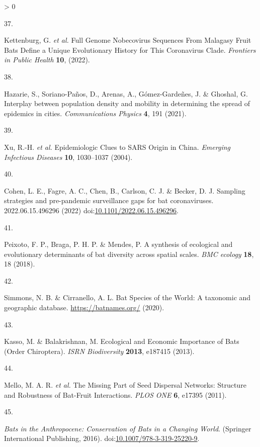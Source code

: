 \documentclass[10pt,oneside]{article}
\newlength{\cslhangindent}
\newlength{\csllabelwidth}
\newenvironment{CSLReferences}[3] %
 {%
  \setlength{\parindent}{0pt}
  \ifodd #1 \everypar{\setlength{\hangindent}{\cslhangindent}}\ignorespaces\fi
  \ifnum #2 > 0
  \setlength{\parskip}{#2\baselineskip}
  \fi
 }%
 {}
\newcommand{\CSLLeftMargin}[1]{\parbox[t]{\maxof{\widthof{#1}}{\csllabelwidth}}{#1}}
\newcommand{\CSLRightInline}[1]{\parbox[t]{\linewidth}{#1}}
\begin{document}
\begin{CSLReferences}{0}{0}
\leavevmode\hypertarget{ref-Kettenburg2022FulGen}{}%
\CSLLeftMargin{37. }
\CSLRightInline{Kettenburg, G. \emph{et al.} Full Genome Nobecovirus
Sequences From Malagasy Fruit Bats Define a Unique Evolutionary History
for This Coronavirus Clade. \emph{Frontiers in Public Health}
\textbf{10}, (2022).}

\leavevmode\hypertarget{ref-Hazarie2021IntPop}{}%
\CSLLeftMargin{38. }
\CSLRightInline{Hazarie, S., Soriano-Paños, D., Arenas, A.,
Gómez-Gardeñes, J. \& Ghoshal, G. Interplay between population density
and mobility in determining the spread of epidemics in cities.
\emph{Communications Physics} \textbf{4}, 191 (2021).}

\leavevmode\hypertarget{ref-Xu2004EpiClu}{}%
\CSLLeftMargin{39. }
\CSLRightInline{Xu, R.-H. \emph{et al.} Epidemiologic Clues to SARS
Origin in China. \emph{Emerging Infectious Diseases} \textbf{10},
1030--1037 (2004).}

\leavevmode\hypertarget{ref-Cohen2022SamStr}{}%
\CSLLeftMargin{40. }
\CSLRightInline{Cohen, L. E., Fagre, A. C., Chen, B., Carlson, C. J. \&
Becker, D. J. Sampling strategies and pre-pandemic surveillance gaps for
bat coronaviruses. 2022.06.15.496296 (2022)
doi:\href{https://doi.org/10.1101/2022.06.15.496296}{10.1101/2022.06.15.496296}.}

\leavevmode\hypertarget{ref-Peixoto2018SynEco}{}%
\CSLLeftMargin{41. }
\CSLRightInline{Peixoto, F. P., Braga, P. H. P. \& Mendes, P. A
synthesis of ecological and evolutionary determinants of bat diversity
across spatial scales. \emph{BMC ecology} \textbf{18}, 18 (2018).}

\leavevmode\hypertarget{ref-Simmons2020BatSpe}{}%
\CSLLeftMargin{42. }
\CSLRightInline{Simmons, N. B. \& Cirranello, A. L. Bat Species of the
World: A taxonomic and geographic database. \url{https://batnames.org/}
(2020).}

\leavevmode\hypertarget{ref-Kasso2013EcoEco}{}%
\CSLLeftMargin{43. }
\CSLRightInline{Kasso, M. \& Balakrishnan, M. Ecological and Economic
Importance of Bats (Order Chiroptera). \emph{ISRN Biodiversity}
\textbf{2013}, e187415 (2013).}

\leavevmode\hypertarget{ref-Mello2011MisPar}{}%
\CSLLeftMargin{44. }
\CSLRightInline{Mello, M. A. R. \emph{et al.} The Missing Part of Seed
Dispersal Networks: Structure and Robustness of Bat-Fruit Interactions.
\emph{PLOS ONE} \textbf{6}, e17395 (2011).}

\leavevmode\hypertarget{ref-Voigt2016BatAnt}{}%
\CSLLeftMargin{45. }
\CSLRightInline{\emph{Bats in the Anthropocene: Conservation of Bats in
a Changing World}. (Springer International Publishing, 2016).
doi:\href{https://doi.org/10.1007/978-3-319-25220-9}{10.1007/978-3-319-25220-9}.}


\end{CSLReferences}
\end{document}
